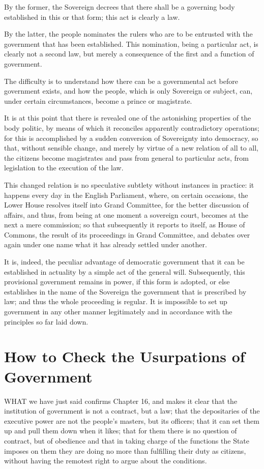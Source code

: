 \documentclass[12pt]{book}
\begin{document}
By the former, the Sovereign decrees that there shall be a governing body established in this or that form; this act is clearly a law.

By the latter, the people nominates the rulers who are to be entrusted with the government that has been established. This nomination, being a particular act, is clearly not a second law, but merely a consequence of the first and a function of government.

The difficulty is to understand how there can be a governmental act before government exists, and how the people, which is only Sovereign or subject, can, under certain circumstances, become a prince or magistrate.

It is at this point that there is revealed one of the astonishing properties of the body politic, by means of which it reconciles apparently contradictory operations; for this is accomplished by a sudden conversion of Sovereignty into democracy, so that, without sensible change, and merely by virtue of a new relation of all to all, the citizens become magistrates and pass from general to particular acts, from legislation to the execution of the law.

This changed relation is no speculative subtlety without instances in practice: it happens every day in the English Parliament, where, on certain occasions, the Lower House resolves itself into Grand Committee, for the better discussion of affairs, and thus, from being at one moment a sovereign court, becomes at the next a mere commission; so that subsequently it reports to itself, as House of Commons, the result of its proceedings in Grand Committee, and debates over again under one name what it has already settled under another.

It is, indeed, the peculiar advantage of democratic government that it can be established in actuality by a simple act of the general will. Subsequently, this provisional government remains in power, if this form is adopted, or else establishes in the name of the Sovereign the government that is prescribed by law; and thus the whole proceeding is regular. It is impossible to set up government in any other manner legitimately and in accordance with the principles so far laid down.

\section{How to Check the Usurpations of Government}
WHAT we have just said confirms Chapter 16, and makes it clear that the institution of government is not a contract, but a law; that the depositaries of the executive power are not the people's masters, but its officers; that it can set them up and pull them down when it likes; that for them there is no question of contract, but of obedience and that in taking charge of the functions the State imposes on them they are doing no more than fulfilling their duty as citizens, without having the remotest right to argue about the conditions.
\end{document}
